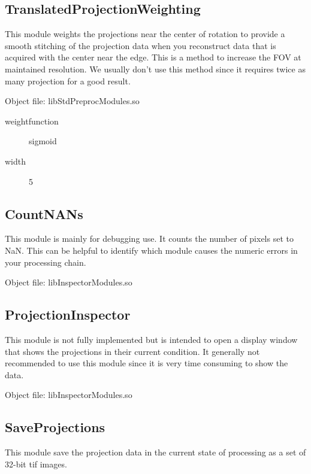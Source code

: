 \documentclass[a4paper]{scrreprt}
\begin{document}
\subsection{TranslatedProjectionWeighting}
This module weights the projections near the center of rotation to provide a smooth stitching of the projection data when you reconstruct data that is acquired with the center near the edge. This is a method to increase the FOV at maintained resolution. We usually don't use this method since it requires twice as many projection for a good result. 

Object file: libStdPreprocModules.so
\begin{description}
 \item[weightfunction] sigmoid
 \item[width] 5
\end{description}

\subsection{CountNANs}
This module is mainly for debugging use. It counts the number of pixels set to NaN. This can be helpful to identify which module causes the numeric errors in your processing chain.

Object file: libInspectorModules.so

\subsection{ProjectionInspector}
This module is not fully implemented but is intended to open a display window that shows the projections in their current condition. It generally not recommended to use this module since it is very time consuming to show the data.

Object file: libInspectorModules.so

\subsection{SaveProjections}
This module save the projection data in the current state of processing as a set of 32-bit tif images.
\end{document}
